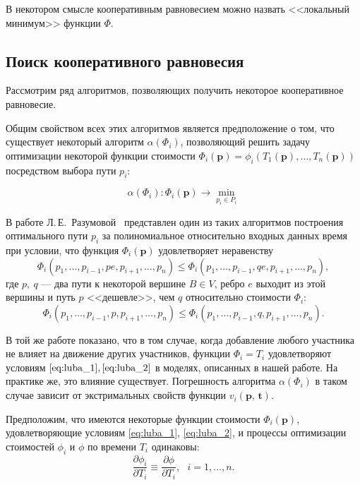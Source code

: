 \documentclass[12pt, a4paper]{article}
\begin{document}
В некотором смысле кооперативным равновесием можно назвать <<локальный минимум>> функции $\Phi$.

\subsection{Поиск кооперативного равновесия}
Рассмотрим ряд алгоритмов, позволяющих получить некоторое кооперативное равновесие.

Общим свойством всех этих алгоритмов является предположение о том, что существует некоторый алгоритм $\alpha (\Phi_i)$, позволяющий решить задачу оптимизации некоторой функции стоимости $\Phi_i (\textbf{p}) = \phi_i(T_1(\textbf{p}), \ldots, T_n(\textbf{p}))$ посредством выбора пути $p_i$:

\begin{equation}
\label{eq:task_mini}
\alpha (\Phi_i): \Phi_i (\textbf{p}) \rightarrow \min \limits _{p_i \in P_i}
\end{equation}

В работе Л.\,Е.~Разумовой~\cite{Luba} представлен один из таких алгоритмов построения оптимального пути $p_i$ за полиномиальное относительно входных данных время при условии, что функция $\Phi_i (\textbf{p})$ удовлетворяет неравенству
\begin{equation}
	\label{eq:luba_1}
	\Phi_i (p_1, \ldots, p_{i - 1}, pe, p_{i + 1}, \ldots, p_n) \le 
	\Phi_i (p_1, \ldots, p_{i - 1}, qe, p_{i + 1}, \ldots, p_n),
\end{equation}
где $p, \: q$ --- два пути к некоторой вершине $B \in V$, ребро $e$ выходит из этой вершины и путь $p$ <<дешевле>>, чем $q$ относительно стоимости $\Phi_i$:
\begin{equation}
	\label{eq:luba_2}
	\Phi_i (p_1, \ldots, p_{i - 1}, p, p_{i + 1}, \ldots, p_n) \le
  	\Phi_i (p_1, \ldots, p_{i - 1}, q, p_{i + 1}, \ldots, p_n).
\end{equation}

В той же работе показано, что в том случае, когда добавление любого участника не влияет на движение других участников, функции $\Phi_i = T_i$ удовлетворяют условиям  $\eqref{eq:luba_1}, \eqref{eq:luba_2}$ в моделях, описанных в нашей работе. На практике же, это влияние существует. Погрешность алгоритма $\alpha (\Phi_i)$ в таком случае зависит от экстримальных свойств функции $v_i (\textbf{p, t})$.

Предположим, что имеются некоторые функции стоимости $\Phi_i (\textbf{p})$, удовлетворяющие условиям \eqref{eq:luba_1}, \eqref{eq:luba_2}, и процессы оптимизации стоимостей $\phi_i$ и $\phi$ по времени $T_i$ одинаковы:
\begin{equation}
	\label{eq:phi_restr}
	\frac{\partial \phi_i}{\partial T_i} \equiv \frac{\partial \phi}{\partial T_i}, \text{ } i = 1, \ldots, n.
\end{equation}
\end{document}
